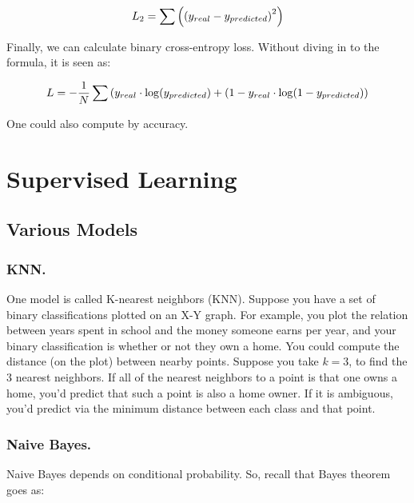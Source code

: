 \begin{equation}
\begin{split}
    L_2 = \sum \left(\left(y_{real} - y_{predicted}\right)^2\right)
\end{split}
\end{equation}

Finally, we can calculate binary cross-entropy loss. Without diving in to the formula, it is seen as: 

\begin{equation}
\begin{split}
    L = -\frac{1}{N}\sum \left(y_{real} \cdot \log(y_{predicted}) + (1-y_{real}\cdot\log(1-y_{predicted})\right)
\end{split}
\end{equation}

One could also compute by accuracy. 

\section{Supervised Learning}

\subsection{Various Models}

\subsubsection{KNN.}
One model is called K-nearest neighbors (KNN). Suppose you have a set of binary classifications plotted on an X-Y graph. For example, you plot the relation between years spent in school and the money someone earns per year, and your binary classification is whether or not they own a home. You could compute the distance (on the plot) between nearby points. Suppose you take $k = 3$, to find the 3 nearest neighbors. If all of the nearest neighbors to a point is that one owns a home, you'd predict that such a point is also a home owner. If it is ambiguous, you'd predict via the minimum distance between each class and that point. 

\subsubsection{Naive Bayes.}

\label{sec:naivebayes}

Naive Bayes depends on conditional probability. So, recall that Bayes theorem goes as: 

